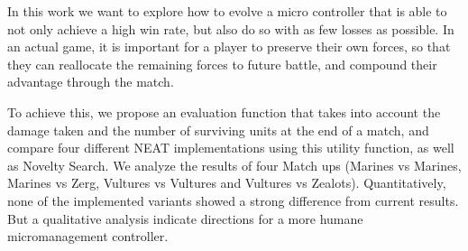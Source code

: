 In this work we want to explore how to evolve a micro controller that
is able to not only achieve a high win rate, but also do so with as
few losses as possible. In an actual game, it is important for a player
to preserve their own forces, so that they can reallocate the remaining
forces to future battle, and compound their advantage through the match.

To achieve this, we propose an evaluation function that takes into
account the damage taken and the number of surviving units at the end
of a match, and compare four different NEAT implementations using this
utility function, as well as Novelty Search. We analyze the results of
four Match ups (Marines vs Marines, Marines vs Zerg, Vultures vs
Vultures and Vultures vs Zealots). Quantitatively, none of the
implemented variants showed a strong difference from current
results. But a qualitative analysis indicate directions for a more
humane micromanagement controller.
